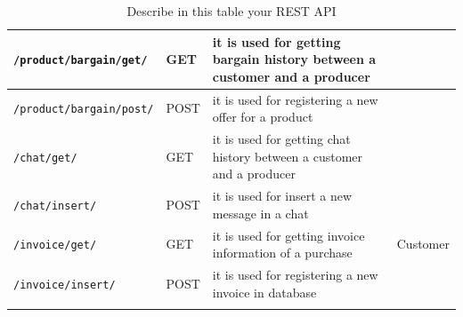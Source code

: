 \begin{longtable}{|p{}|p{} |p{}|p{}|}
\texttt{/product/bargain/get/} & GET &  it is used for getting bargain history between a customer and a producer & \\\hline
\texttt{/product/bargain/post/} & POST &  it is used for registering a new offer for a product & \\\hline
\texttt{/chat/get/} & GET &  it is used for getting chat history between a customer and a producer & \\\hline
\texttt{/chat/insert/} & POST &  it is used for insert a new message in a chat & \\\hline
\texttt{/invoice/get/} & GET &  it is used for getting invoice information of a purchase & Customer\\\hline
\texttt{/invoice/insert/} & POST &  it is used for registering a new invoice in database & \\\hline
\caption{Describe in this table your REST API}
\label{tab:termGlossary}
\end{longtable}